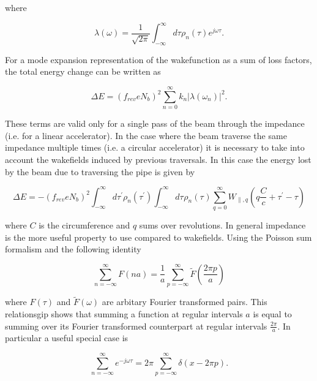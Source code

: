 where 

\begin{equation}
\lambda \left( \omega \right) = \frac{1}{\sqrt{2 \pi}}\int^{\infty}_{-\infty} d \tau \rho_{n} \left( \tau \right) e^{j\omega \tau}. 
\end{equation}

For a mode expansion representation of the wakefunction as a sum of loss factors, the total energy change can be written as 

\begin{equation}
\Delta E = \left( f_{rev} e N_{b}\right)^{2} \displaystyle\sum\limits_{n = 0}^{\infty} k_{n} \left| \lambda \left( \omega_{n} \right)  \right|^{2}.
\end{equation}

These terms are valid only for a single pass of the beam through the impedance (i.e. for a linear accelerator). In the case where the beam traverse the same impedance multiple times (i.e. a circular accelerator) it is necessary to take into account the wakefields induced by previous traversals. In this case the energy lost by the beam due to traversing the pipe is given by

\begin{equation}
\Delta E = - \left( f_{rev} e N_{b}\right)^{2} \int^{\infty}_{-\infty} d\tau^{'} \rho_{n} \left( \tau^{'} \right) \int^{\infty}_{-\infty} d\tau^{} \rho_{n} \left( \tau^{} \right) \displaystyle\sum\limits_{q = 0}^{\infty} W_{\parallel, q} \left( q\frac{C}{c} + \tau^{'} - \tau \right)  
\label{eqn:sum_wake_loss}
\end{equation}

where $C$ is the circumference and $q$ sums over revolutions. In general impedance is the more useful property to use compared to wakefields. Using the Poisson sum formalism and the following identity

\begin{equation}
\displaystyle\sum\limits_{n = -\infty}^{\infty} F \left( n a \right) = \frac{1}{a} \displaystyle\sum\limits_{p = -\infty}^{\infty} \tilde{F} \left( \frac{2\pi p}{a} \right)
\end{equation}

where $F(\tau)$ and $\tilde{F}(\omega)$ are arbitary Fourier transformed pairs. This relationsgip shows that summing a function at regular intervals $a$ is equal to summing over its Fourier transformed counterpart at regular intervals $\frac{2 \pi}{a}$. In particular a useful special case is

\begin{equation}
\displaystyle\sum\limits_{n = -\infty}^{\infty} e^{-j\omega \tau} = 2\pi \displaystyle\sum\limits_{p = -\infty}^{\infty} \delta \left( x - 2\pi p \right).
\end{equation}

